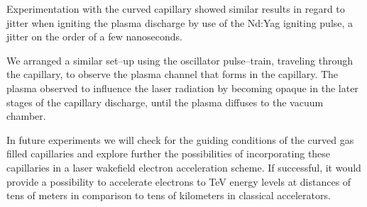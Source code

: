 \documentclass[../main.tex]{subfiles}
\begin{document}
Experimentation with the curved capillary showed similar results in regard to jitter when igniting the plasma discharge by use of the Nd:Yag igniting pulse, a jitter on the order of a few nanoseconds.

We arranged a similar set--up using the oscillator pulse--train, traveling through the capillary, to observe the plasma channel that forms in the capillary. The plasma observed to influence the laser radiation by becoming opaque in the later stages of the capillary discharge, until the plasma diffuses to the vacuum chamber.

In future experiments we will check for the guiding conditions of the curved gas filled capillaries and explore further the possibilities of incorporating these capillaries in a laser wakefield electron acceleration scheme. If successful, it would provide a possibility to accelerate electrons to \si{\tera\eV} energy levels at distances of tens of meters in comparison to tens of kilometers in classical accelerators.

\printbibliography
\end{document}
